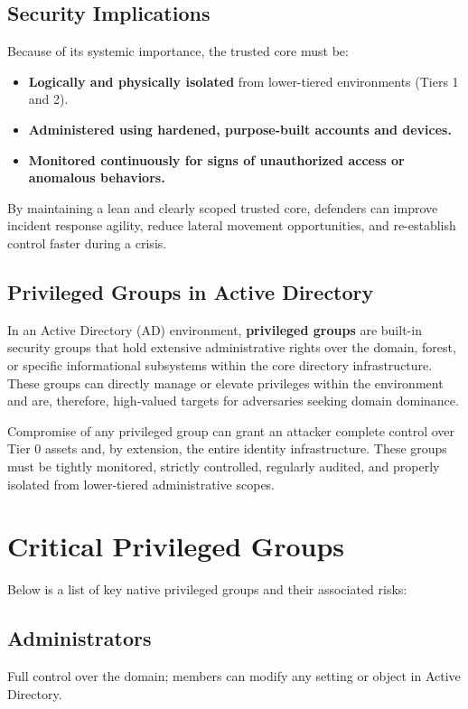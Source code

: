\subsection{Security Implications}
Because of its systemic importance, the trusted core must be:

\begin{itemize}
    \item \textbf{Logically and physically isolated} from lower-tiered environments (Tiers 1 and 2).
    \item \textbf{Administered using hardened, purpose-built accounts and devices.}
    \item \textbf{Monitored continuously for signs of unauthorized access or anomalous behaviors.}
\end{itemize}

By maintaining a lean and clearly scoped trusted core, defenders can improve incident response agility, reduce lateral movement opportunities, and re-establish control faster during a crisis.

\subsection{Privileged Groups in Active Directory}
In an Active Directory (AD) environment, \textbf{privileged groups} are built-in security groups that hold extensive administrative rights over the domain, forest, or specific informational subsystems within the core directory infrastructure. These groups can directly manage or elevate privileges within the environment and are, therefore, high-valued targets for adversaries seeking domain dominance.

Compromise of any privileged group can grant an attacker complete control over Tier 0 assets and, by extension, the entire identity infrastructure. These groups must be tightly monitored, strictly controlled, regularly audited, and properly isolated from lower-tiered administrative scopes.

\section{Critical Privileged Groups}
Below is a list of key native privileged groups and their associated risks:

\subsection{Administrators}
Full control over the domain; members can modify any setting or object in Active Directory.

